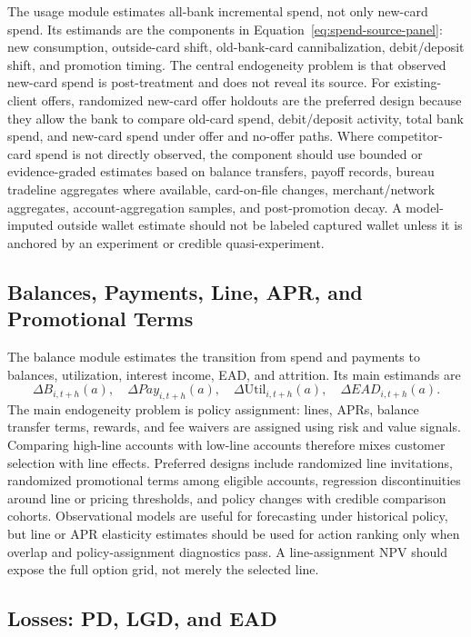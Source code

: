 \documentclass[11pt]{article}
\newcommand{\1}{\mathbf{1}}
\begin{document}
The usage module estimates all-bank incremental spend, not only new-card
spend. Its estimands are the components in
Equation~\eqref{eq:spend-source-panel}: new consumption, outside-card shift,
old-bank-card cannibalization, debit/deposit shift, and promotion timing. The
central endogeneity problem is that observed new-card spend is post-treatment
and does not reveal its source. For existing-client offers, randomized
new-card offer holdouts are the preferred design because they allow the bank
to compare old-card spend, debit/deposit activity, total bank spend, and
new-card spend under offer and no-offer paths. Where competitor-card spend is
not directly observed, the component should use bounded or evidence-graded
estimates based on balance transfers, payoff records, bureau tradeline
aggregates where available, card-on-file changes, merchant/network aggregates,
account-aggregation samples, and post-promotion decay. A model-imputed outside
wallet estimate should not be labeled captured wallet unless it is anchored by
an experiment or credible quasi-experiment.

\subsection*{Balances, Payments, Line, APR, and Promotional Terms}

The balance module estimates the transition from spend and payments to
balances, utilization, interest income, EAD, and attrition. Its main estimands
are
\[
  \Delta B_{i,t+h}(a),\quad
  \Delta Pay_{i,t+h}(a),\quad
  \Delta \mathrm{Util}_{i,t+h}(a),\quad
  \Delta EAD_{i,t+h}(a).
\]
The main endogeneity problem is policy assignment: lines, APRs, balance
transfer terms, rewards, and fee waivers are assigned using risk and value
signals. Comparing high-line accounts with low-line accounts therefore mixes
customer selection with line effects. Preferred designs include randomized
line invitations, randomized promotional terms among eligible accounts,
regression discontinuities around line or pricing thresholds, and policy
changes with credible comparison cohorts. Observational models are useful for
forecasting under historical policy, but line or APR elasticity estimates
should be used for action ranking only when overlap and policy-assignment
diagnostics pass. A line-assignment NPV should expose the full option grid,
not merely the selected line.

\subsection*{Losses: PD, LGD, and EAD}
\end{document}
